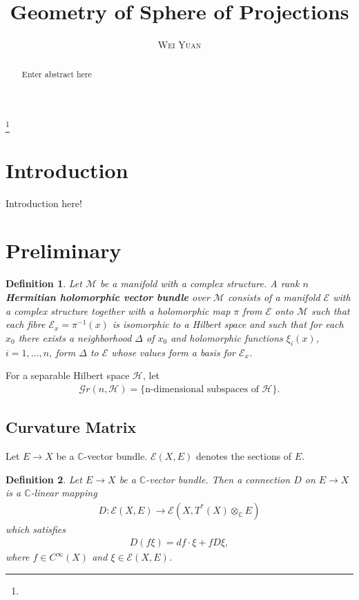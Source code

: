 \documentclass[a4paper,10pt]{amsart}
\newtheorem{definition}{Definition}[section]
\newcommand{\HHH}{\mathcal H} %
\newcommand{\C}{\mathbb C} %
\newcommand{\M}{\mathcal M} %
\newcommand{\E}{\mathcal E}
\newcommand{\Gr}{\mathcal Gr} %
\newcommand{\titleinfo}{Geometry of Sphere of Projections}
\newcommand{\authorinfo}{Wei Yuan}
\begin{document}
\title{\LARGE\textbf{\titleinfo}} 
\author{\large\textsc{\authorinfo}} 
\address{AMSS}  
\email{}

\date{}

\begin{abstract}
Enter abstract here
\end{abstract}

\keywords{}
\thanks{}
\maketitle


\section*{Introduction}
Introduction here!


\section{Preliminary}

\begin{definition}
   Let $\M$ be a manifold with a complex structure. 
   A rank $n$ \textbf{Hermitian holomorphic vector bundle} 
   over $\M$ consists of 
   a manifold $\E$ with a complex structure together with a 
   holomorphic map $\pi$ from $\E$ onto $\M$ such that each
   fibre $\E_{x} = \pi^{-1}(x)$ is isomorphic to a Hilbert space
   and such that for each $x_0$ there exists a neighborhood $\Delta$
   of $x_0$ and holomorphic functions $\xi_{i}(x)$, $i = 1, \ldots, n$,
   form $\Delta$ to $\E$ whose values form a basis for $\E_{x}$.
\end{definition}

For a separable Hilbert space $\HHH$, let 
\begin{align*}
    \Gr (n, \HHH) = \{\mbox{n-dimensional subspaces of $\HHH$} \}.  
\end{align*}

\subsection{Curvature Matrix}
Let $E \rightarrow X$ be a $\C$-vector bundle.
$\E(X, E)$ denotes the sections of $E$.

\begin{definition}
   Let $E \rightarrow X$ be a $\C$-vector bundle. 
   Then a connection 
   $D$ on $E \rightarrow X$ is a $\C$-linear mapping
   \begin{align*}
       D: \E(X,E) \rightarrow \E(X, T^{*}(X) \otimes_{\C} E)  
   \end{align*}
   which satisfies 
   \begin{align*}
       D(f \xi) = df \cdot \xi + f D\xi,
   \end{align*}
   where $f \in C^{\infty}(X)$ and $\xi \in \E(X, E)$.
\end{definition}
\end{document}
